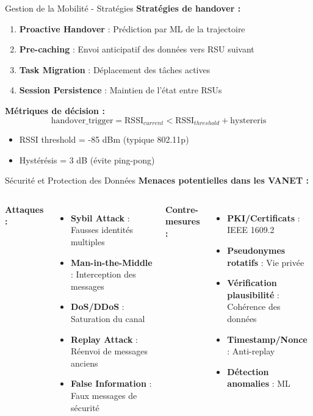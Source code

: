 ﻿\documentclass[aspectratio=169,11pt]{beamer}
\begin{document}
\begin{frame}{Gestion de la Mobilit\'e - Strat\'egies}
\textbf{Strat\'egies de handover :}

\begin{enumerate}
    \item \textbf{Proactive Handover} : Pr\'ediction par ML de la trajectoire
    \item \textbf{Pre-caching} : Envoi anticipatif des donn\'ees vers RSU suivant
    \item \textbf{Task Migration} : D\'eplacement des t\^aches actives
    \item \textbf{Session Persistence} : Maintien de l'\'etat entre RSUs
\end{enumerate}

\vspace{0.3cm}
\textbf{M\'etriques de d\'ecision :}
\begin{equation}
\text{handover\_trigger} = \text{RSSI}_{current} < \text{RSSI}_{threshold} + \text{hystereris}
\end{equation}

\begin{itemize}
    \item RSSI threshold = -85 dBm (typique 802.11p)
    \item Hyst\'er\'esis = 3 dB (\'evite ping-pong)
\end{itemize}
\end{frame}

\begin{frame}{S\'ecurit\'e et Protection des Donn\'ees}
\textbf{Menaces potentielles dans les VANET :}

\begin{columns}
\textbf{Attaques :}
\begin{itemize}
    \item \textbf{Sybil Attack} : Fausses identit\'es multiples
    \item \textbf{Man-in-the-Middle} : Interception des messages
    \item \textbf{DoS/DDoS} : Saturation du canal
    \item \textbf{Replay Attack} : R\'eenvoi de messages anciens
    \item \textbf{False Information} : Faux messages de s\'ecurit\'e
\end{itemize}

\textbf{Contre-mesures :}
\begin{itemize}
    \item \textbf{PKI/Certificats} : IEEE 1609.2
    \item \textbf{Pseudonymes rotatifs} : Vie priv\'ee
    \item \textbf{V\'erification plausibilit\'e} : Coh\'erence des donn\'ees
    \item \textbf{Timestamp/Nonce} : Anti-replay
    \item \textbf{D\'etection anomalies} : ML
\end{itemize}
\end{columns}
\end{frame}
\end{document}
